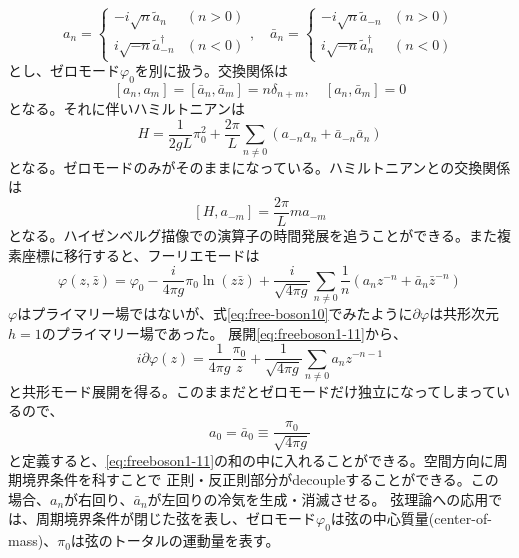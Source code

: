 \documentclass[11pt, aps, longbibliography]{article}
\numberwithin{equation}{section}
\begin{document}
        \begin{equation}\label{eq:freeboson1-7}
            a_n =\left\{\begin{array}{ll}
                -i\sqrt{n}\tilde{a}_n & (n>0) \\ i\sqrt{-n}\tilde{a}_{-n}^\dagger & (n<0)
            \end{array}\right. ,\quad \bar{a}_n =\left\{\begin{array}{ll}
                -i\sqrt{n}\tilde{a}_{-n} & (n>0) \\ i\sqrt{-n}\tilde{a}_{n}^\dagger & (n<0)
            \end{array}\right.
        \end{equation}
        とし、ゼロモード$\varphi_0$を別に扱う。交換関係は
        \begin{equation}\label{eq:freeboson1-8}
            [a_n, a_m] = [\bar{a}_n, \bar{a}_m] = n\delta_{n+m}, \quad [a_n, \bar{a}_m]=0
        \end{equation}
        となる。それに伴いハミルトニアンは
        \begin{equation}\label{eq:freeboson1-9}
            H = \frac{1}{2gL}\pi_0^2 + \frac{2\pi}{L}\sum_{n\neq0}(a_{-n}a_n + \bar{a}_{-n}\bar{a}_n)
        \end{equation}
        となる。ゼロモードのみがそのままになっている。ハミルトニアンとの交換関係は
        \begin{equation}\label{eq:freeboson1-10}
            [H, a_{-m}] = \frac{2\pi}{L}ma_{-m}
        \end{equation}
        となる。ハイゼンベルグ描像での演算子の時間発展を追うことができる。また複素座標に移行すると、フーリエモードは
        \begin{equation}\label{eq:freeboson1-11}
            \varphi(z, \bar{z}) = \varphi_0 - \frac{i}{4\pi g}\pi_0 \ln(z\bar{z}) + \frac{i}{\sqrt{4\pi g}} \sum_{n\neq0}\frac{1}{n}(a_nz^{-n}+\bar{a}_n\bar{z}^{-n})
        \end{equation}
        $\varphi$はプライマリー場ではないが、式\eqref{eq:free-boson10}でみたように$\partial \varphi$は共形次元$h=1$のプライマリー場であった。
        展開\eqref{eq:freeboson1-11}から、
        \begin{equation}\label{eq:freeboson1-12}
            i\partial \varphi(z) = \frac{1}{4\pi g}\frac{\pi_0}{z} + \frac{1}{\sqrt{4\pi g}}\sum_{n\neq0}a_nz^{-n-1}
        \end{equation}
        と共形モード展開を得る。このままだとゼロモードだけ独立になってしまっているので、
        \begin{equation}\label{eq:freeboson1-13}
            a_0 = \bar{a}_0 \equiv \frac{\pi_0}{\sqrt{4\pi g}}
        \end{equation}
        と定義すると、\eqref{eq:freeboson1-11}の和の中に入れることができる。空間方向に周期境界条件を科すことで
        正則・反正則部分がdecoupleすることができる。この場合、$a_n$が右回り、$\bar{a}_n$が左回りの冷気を生成・消滅させる。
        弦理論への応用では、周期境界条件が閉じた弦を表し、ゼロモード$\varphi_0$は弦の中心質量(center-of-mass)、$\pi_0$は弦のトータルの運動量を表す。
    
\end{document}
